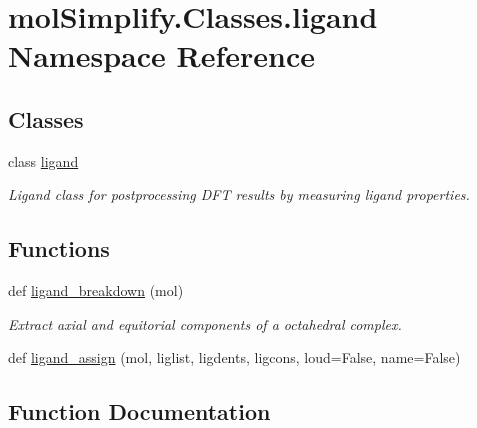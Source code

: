 \hypertarget{namespacemolSimplify_1_1Classes_1_1ligand}{}\section{mol\+Simplify.\+Classes.\+ligand Namespace Reference}
\label{namespacemolSimplify_1_1Classes_1_1ligand}
\subsection*{Classes}
\begin{DoxyCompactItemize}
\item 
class \hyperlink{classmolSimplify_1_1Classes_1_1ligand_1_1ligand}{ligand}
\begin{DoxyCompactList}\small\item\em Ligand class for postprocessing D\+FT results by measuring ligand properties. \end{DoxyCompactList}\end{DoxyCompactItemize}
\subsection*{Functions}
\begin{DoxyCompactItemize}
\item 
def \hyperlink{namespacemolSimplify_1_1Classes_1_1ligand_a12137cc10c21aa301cdbb3b8fea4587b}{ligand\+\_\+breakdown} (mol)
\begin{DoxyCompactList}\small\item\em Extract axial and equitorial components of a octahedral complex. \end{DoxyCompactList}\item 
def \hyperlink{namespacemolSimplify_1_1Classes_1_1ligand_af3e381b3fddbf3c317a63da1c36abca5}{ligand\+\_\+assign} (mol, liglist, ligdents, ligcons, loud=False, name=False)
\end{DoxyCompactItemize}


\subsection{Function Documentation}
\mbox{\label{namespacemolSimplify_1_1Classes_1_1ligand_af3e381b3fddbf3c317a63da1c36abca5}} 

